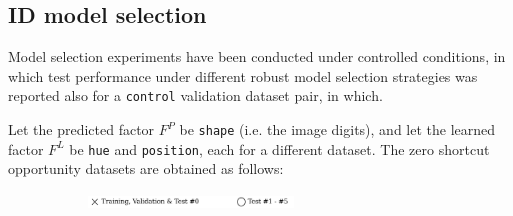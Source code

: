 \subsection{ID model selection}

Model selection experiments have been conducted under controlled conditions, in which test performance
under different robust model selection strategies was reported also for a \texttt{control} validation
dataset pair, in which. \\

\begin{definition}\label{def:zgo_experiments}
    Let the predicted factor $F^P$ be \texttt{shape} (i.e. the image digits), and let the 
    learned factor $F^L$ be \texttt{hue} and \texttt{position}, each for a different dataset. The zero 
    shortcut opportunity datasets are obtained as follows:

    \begin{figure}[H]
        \centering
        \begin{subfigure}[b]{\textwidth}
            \centering
            \includegraphics[width=0.6\textwidth]{img/datasets/_legend.pdf}
        \end{subfigure}
        \vspace{-0.2cm} %


\end{figure}
\end{definition}
